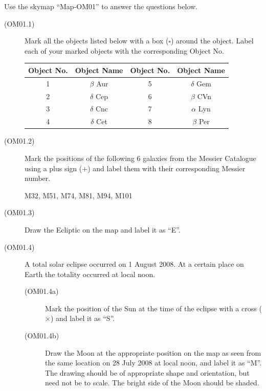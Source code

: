 Use the skymap ``Map-OM01'' to answer the questions below.


\begin{description}
\item[(OM01.1)] Mark all the objects listed below with a box ($\square$)
  around the object. Label each of your marked objects with the corresponding
  Object No.

  \begin{center}
  \begin{tabular}{cccc}
  Object No. & Object Name & Object No. & Object Name \\
  \hline
  1 & $\beta$ Aur & 5 & $\delta$ Gem \\
  2 & $\delta$ Cep & 6 & $\beta$ CVn \\
  3 & $\delta$ Cnc & 7 & $\alpha$ Lyn \\
  4 & $\delta$ Cet & 8 & $\beta$ Per \\
  \end{tabular}
  \end{center}

\item[(OM01.2)] Mark the positions of the following 6 galaxies from the
  Messier Catalogue using a plus sign ($+$) and label them with their
  corresponding Messier number.

  M32, M51, M74, M81, M94, M101

\item[(OM01.3)] Draw the Ecliptic on the map and label it as ``E''.

\item[(OM01.4)] A total solar eclipse occurred on 1 August 2008. At a certain
  place on Earth the totality occurred at local noon.
  \begin{description}
  \item[(OM01.4a)] Mark the position of the Sun at the time of the eclipse
    with a cross ($\times$) and label it as ``S''.
  \item[(OM01.4b)] Draw the Moon at the appropriate position on the map as
    seen from the same location on 28 July 2008 at local noon, and label it as
    ``M''. The drawing should be of appropriate shape and orientation, but
    need not be to scale. The bright side of the Moon should be shaded.
  \end{description}
\end{description}
